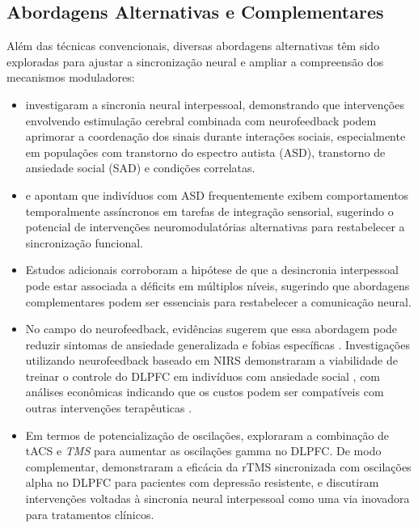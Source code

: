 \subsection{Abordagens Alternativas e Complementares}
Além das técnicas convencionais, diversas abordagens alternativas têm sido exploradas para ajustar a sincronização neural e ampliar a compreensão dos mecanismos moduladores:
\begin{itemize}
    \item {} investigaram a sincronia neural interpessoal, demonstrando que intervenções envolvendo estimulação cerebral combinada com neurofeedback podem aprimorar a coordenação dos sinais durante interações sociais, especialmente em populações com transtorno do espectro autista (ASD), transtorno de ansiedade social (SAD) e condições correlatas.
    \item {} e  apontam que indivíduos com ASD frequentemente exibem comportamentos temporalmente assíncronos em tarefas de integração sensorial, sugerindo o potencial de intervenções neuromodulatórias alternativas para restabelecer a sincronização funcional.
    \item Estudos adicionais \cite{gerloff2022autism, quinones2021dysfunction, key2022greater, tanabe2012hard} corroboram a hipótese de que a desincronia interpessoal pode estar associada a déficits em múltiplos níveis, sugerindo que abordagens complementares podem ser essenciais para restabelecer a comunicação neural.
    \item No campo do neurofeedback, evidências sugerem que essa abordagem pode reduzir sintomas de ansiedade generalizada e fobias específicas \cite{hou2021neurofeedback, zilverstand2015fmri}. Investigações utilizando neurofeedback baseado em NIRS demonstraram a viabilidade de treinar o controle do DLPFC em indivíduos com ansiedade social \cite{kimmig2019feasibility, direito2021training, steiner2014pilot, lamarca2018facilitating, catala2017treatment}, com análises econômicas indicando que os custos podem ser compatíveis com outras intervenções terapêuticas \cite{arnold2013eeg}.
    \item Em termos de potencialização de oscilações,  exploraram a combinação de tACS e \textit{TMS} para aumentar as oscilações gamma no DLPFC. De modo complementar,  demonstraram a eficácia da rTMS sincronizada com oscilações alpha no DLPFC para pacientes com depressão resistente, e  discutiram intervenções voltadas à sincronia neural interpessoal como uma via inovadora para tratamentos clínicos.
\end{itemize}

